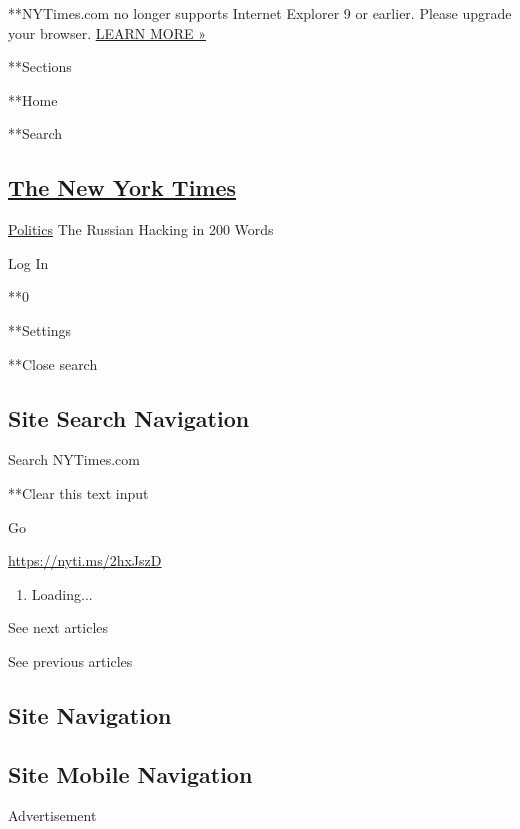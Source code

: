  **NYTimes.com no longer supports Internet Explorer 9 or earlier. Please
upgrade your browser.
\href{http://www.nytimes3xbfgragh.onion/content/help/site/ie9-support.html}{LEARN
MORE »}

**Sections

**Home

**Search

\hypertarget{the-new-york-times}{%
\subsection{\texorpdfstring{\href{http://www.nytimes3xbfgragh.onion/}{The
New York Times}}{The New York Times}}\label{the-new-york-times}}

 \href{/section/politics}{Politics} \textbar{}The Russian Hacking in 200
Words

Log In

**0

**Settings

**Close search

\hypertarget{site-search-navigation}{%
\subsection{Site Search Navigation}\label{site-search-navigation}}

Search NYTimes.com

**Clear this text input

Go

\url{https://nyti.ms/2hxJszD}

\begin{enumerate}
\def\labelenumi{\arabic{enumi}.}
\item
  Loading...
\end{enumerate}

See next articles

See previous articles

\hypertarget{site-navigation}{%
\subsection{Site Navigation}\label{site-navigation}}

\hypertarget{site-mobile-navigation}{%
\subsection{Site Mobile Navigation}\label{site-mobile-navigation}}

Advertisement

